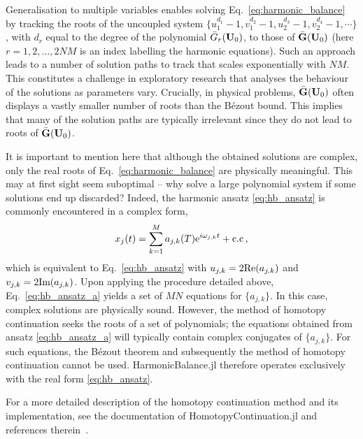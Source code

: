 Generalisation to multiple variables enables solving Eq.~\eqref{eq:harmonic_balance} by tracking the roots of the uncoupled system  $\{u_1^{d_1} - 1,v_1^{d_2} - 1,u_2^{d_3} - 1,v_2^{d_4} - 1,\cdots\}$, with $d_r$ equal to the degree of the polynomial $\bar{G}_r(\vb{U}_0)$, to those of $\bar{\vb{G}}(\vb{U}_0)$ (here $r=1,2,\ldots,2NM$ is an index labelling the harmonic equations). Such an approach leads to a number of solution paths to track that scales exponentially with $NM$. This constitutes a challenge in exploratory research that analyses the behaviour of the solutions as parameters vary. Crucially, in physical problems, $\bar{\vb{G}}(\vb{U}_0)$ often displays a vastly smaller number of roots than the B\'{e}zout bound. This implies that many of the solution paths are typically irrelevant since they do not lead to roots of $\bar{\vb{G}}(\vb{U}_0)$.

It is important to mention here that although the obtained solutions are complex, only the real roots of Eq.~\eqref{eq:harmonic_balance} are physically meaningful. This may at first sight seem suboptimal -- why solve a large polynomial system if some solutions end up discarded? Indeed, the harmonic ansatz \eqref{eq:hb_ansatz} is commonly encountered in a complex form,
\begin{equation} \label{eq:hb_ansatz_a}
x_j(t) = \sum_{k=1}^M a_{j,k}(T) {\rm e}^{i \omega_{j,k} t } + \text{c.c} \,,
\end{equation} 
which is equivalent to Eq.~\eqref{eq:hb_ansatz} with $u_{j,k} = 2 \text{Re} (a_{j,k})$ and $v_{j,k} = 2 \text{Im} (a_{j,k})$. Upon applying the procedure detailed above, Eq.~\eqref{eq:hb_ansatz_a} yields a set of $MN$ equations for $\{ a_{j,k}\}$. In this case, complex solutions are physically sound. However, the method of homotopy continuation seeks the roots of a set of polynomials; the equations obtained from ansatz \eqref{eq:hb_ansatz_a} will typically contain complex conjugates of $\{ a_{j,k}\}$. For such equations, the B\'{e}zout theorem and subsequently the method of homotopy continuation cannot be used. HarmonicBalance.jl therefore operates exclusively with the real form \eqref{eq:hb_ansatz}.  

For a more detailed description of the homotopy continuation method and its implementation, see the documentation of HomotopyContinuation.jl and references therein~\cite{Sommese2005,Breiding_2018,timme2021numerical}. 

